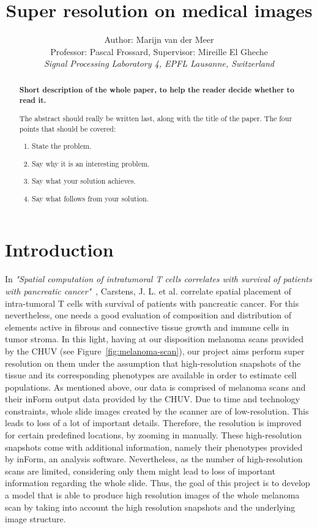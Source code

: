 \documentclass[10pt,conference,compsocconf]{IEEEtran}
\begin{document}
\title{Super resolution on medical images}
\author{
  Author: Marijn van der Meer\\
  Professor: Pascal Frossard, Supervisor: Mireille El Gheche \\
  \textit{Signal Processing Laboratory 4, EPFL Lausanne, Switzerland}
}

\maketitle

\begin{abstract}
\textbf{ Short description of the whole paper, to help the
  reader decide whether to read it.}

The abstract should really be written last, along with the title of
the paper. The four points that should be covered:
\begin{enumerate}
\item State the problem.
\item Say why it is an interesting problem.
\item Say what your solution achieves.
\item Say what follows from your solution.
\end{enumerate}
 \end{abstract}

\section{Introduction}\label{sec:introduction}

In \textit{"Spatial computation of intratumoral T cells correlates with survival of patients with pancreatic cancer"}~\cite{Carstens2017}, Carstens, J. L. et al. correlate spatial placement of intra-tumoral T cells with survival of patients with pancreatic cancer. For this nevertheless, one needs a good evaluation of composition and distribution of elements active in fibrous and connective tissue growth and immune cells in tumor stroma. In this light, having at our disposition melanoma scans provided by the CHUV (see Figure~\ref{fig:melanoma-scan}), our project aims perform super resolution on them under the assumption that high-resolution snapshots of the tissue and its corresponding phenotypes are available in order to estimate cell populations. As mentioned above, our data is comprised of melanoma scans and their inForm output data provided by the CHUV. Due to time and technology constraints, whole slide images created by the scanner are of low-resolution. This leads to loss of a lot of important details. Therefore, the resolution is improved for certain predefined locations, by zooming in manually. These high-resolution snapshots come with additional information, namely their phenotypes provided by inForm, an analysis software. Nevertheless, as the number of high-resolution scans are limited, considering only them might lead to loss of important information regarding the whole slide. Thus, the goal of this project is to develop a model that is able to produce high resolution images of the whole melanoma scan by taking into
account the high resolution snapshots and the underlying image structure.
\end{document}
